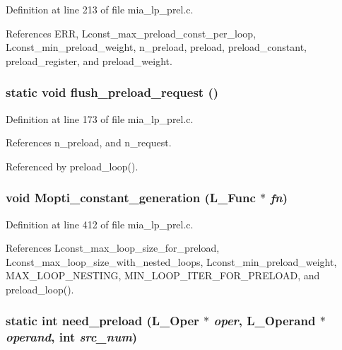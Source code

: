 Definition at line 213 of file mia\_\-lp\_\-prel.c.

References ERR, Lconst\_\-max\_\-preload\_\-const\_\-per\_\-loop, Lconst\_\-min\_\-preload\_\-weight, n\_\-preload, preload, preload\_\-constant, preload\_\-register, and preload\_\-weight.
\subsubsection{\setlength{\rightskip}{0pt plus 5cm}static void flush\_\-preload\_\-request ()\hspace{0.3cm}{\tt  [static]}}\label{mia__lp__prel_8c_f9b3bc9bc46f68ad66bf5419d5810dbf}




Definition at line 173 of file mia\_\-lp\_\-prel.c.

References n\_\-preload, and n\_\-request.

Referenced by preload\_\-loop().
\subsubsection{\setlength{\rightskip}{0pt plus 5cm}void Mopti\_\-constant\_\-generation (L\_\-Func $\ast$ {\em fn})}\label{mia__lp__prel_8c_ce49d15c4fd47f651213d2f0a5df9f71}




Definition at line 412 of file mia\_\-lp\_\-prel.c.

References Lconst\_\-max\_\-loop\_\-size\_\-for\_\-preload, Lconst\_\-max\_\-loop\_\-size\_\-with\_\-nested\_\-loops, Lconst\_\-min\_\-preload\_\-weight, MAX\_\-LOOP\_\-NESTING, MIN\_\-LOOP\_\-ITER\_\-FOR\_\-PRELOAD, and preload\_\-loop().
\subsubsection{\setlength{\rightskip}{0pt plus 5cm}static int need\_\-preload (L\_\-Oper $\ast$ {\em oper}, L\_\-Operand $\ast$ {\em operand}, int {\em src\_\-num})\hspace{0.3cm}{\tt  [static]}}\label{mia__lp__prel_8c_d8767f4e13897f750ec4583bc24699a4}




